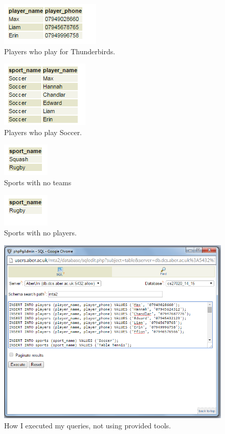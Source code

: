 \documentclass[11pt, article]{article}
\begin{document}
\begin{figure}[ht!]
\includegraphics[center]{Thunderbirds.png}
 \caption{Players who play for Thunderbirds.}
\end{figure}

\begin{figure}[ht!]
\includegraphics[center]{Soccer.png}
 \caption{Players who play Soccer.}
\end{figure}

\begin{figure}[ht!]
\includegraphics[center]{NoTeams.png}
 \caption{Sports with no teams}
\end{figure}

\begin{figure}[ht!]
\includegraphics[center]{NoPlayers.png}
 \caption{Sports with no players.}
\end{figure}

\begin{figure}[ht!]
\includegraphics[center]{QueryExecuter.png}
 \caption{How I executed my queries, not using provided tools.}
\end{figure}
\end{document}
